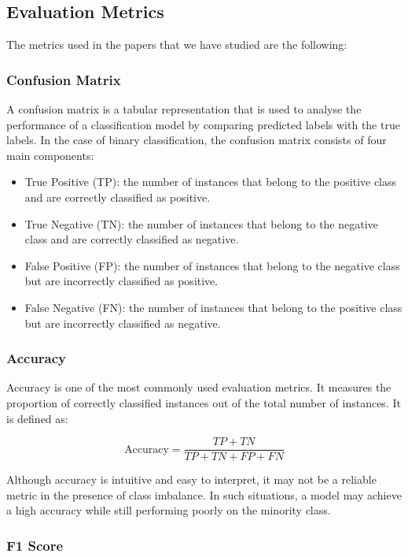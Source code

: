 \documentclass[ENG]{TFUOC}%
\begin{document}
\subsection{Evaluation Metrics}
The metrics used in the papers that we have studied are the following: 

\subsubsection{Confusion Matrix}

A confusion matrix is a tabular representation that is used to analyse the performance of a classification model by comparing predicted labels with the true labels. In the case of binary classification, the confusion matrix consists of four main components:

\begin{itemize}
\item True Positive (TP): the number of instances that belong to the positive class and are correctly classified as positive.
\item True Negative (TN): the number of instances that belong to the negative class and are correctly classified as negative.
\item False Positive (FP): the number of instances that belong to the negative class but are incorrectly classified as positive.
\item False Negative (FN): the number of instances that belong to the positive class but are incorrectly classified as negative.
\end{itemize}

\subsubsection{Accuracy}

Accuracy is one of the most commonly used evaluation metrics. It measures the proportion of correctly classified instances out of the total number of instances. It is defined as:

\begin{equation}
\text{Accuracy} = \frac{TP + TN}{TP + TN + FP + FN}
\end{equation}

Although accuracy is intuitive and easy to interpret, it may not be a reliable metric in the presence of class imbalance. In such situations, a model may achieve a high accuracy while still performing poorly on the minority class.

\subsubsection{F1 Score}
\end{document}
